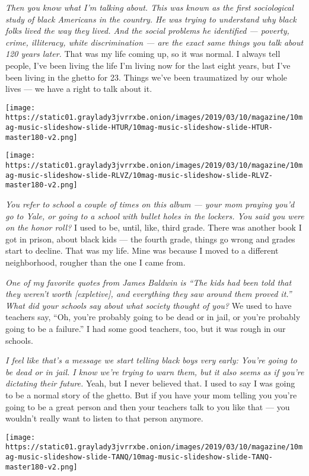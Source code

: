 \emph{Then you know what I'm talking about. This was known as the first
sociological study of black Americans in the country. He was trying to
understand why black folks lived the way they lived. And the social
problems he identified --- poverty, crime, illiteracy, white
discrimination --- are the exact same things you talk about 120 years
later.} That was my life coming up, so it was normal. I always tell
people, I've been living the life I'm living now for the last eight
years, but I've been living in the ghetto for 23. Things we've been
traumatized by our whole lives --- we have a right to talk about it.

\texttt{[image: https://static01.graylady3jvrrxbe.onion/images/2019/03/10/magazine/10mag-music-slideshow-slide-HTUR/10mag-music-slideshow-slide-HTUR-master180-v2.png]}

\texttt{[image: https://static01.graylady3jvrrxbe.onion/images/2019/03/10/magazine/10mag-music-slideshow-slide-RLVZ/10mag-music-slideshow-slide-RLVZ-master180-v2.png]}

\emph{You refer to school a couple of times on this album --- your mom
praying you'd go to Yale, or going to a school with bullet holes in the
lockers. You said you were on the honor roll?} I used to be, until,
like, third grade. There was another book I got in prison, about black
kids --- the fourth grade, things go wrong and grades start to decline.
That was my life. Mine was because I moved to a different neighborhood,
rougher than the one I came from.

\emph{One of my favorite quotes from James Baldwin is ``The kids had
been told that they weren't worth {[}expletive{]}, and everything they
saw around them proved it.'' What did your schools say about what
society thought of you?} We used to have teachers say, ``Oh, you're
probably going to be dead or in jail, or you're probably going to be a
failure.'' I had some good teachers, too, but it was rough in our
schools.

\emph{I feel like that's a message we start telling black boys very
early: You're going to be dead or in jail. I know we're trying to warn
them, but it also seems as if you're dictating their future.} Yeah, but
I never believed that. I used to say I was going to be a normal story of
the ghetto. But if you have your mom telling you you're going to be a
great person and then your teachers talk to you like that --- you
wouldn't really want to listen to that person anymore.

\texttt{[image: https://static01.graylady3jvrrxbe.onion/images/2019/03/10/magazine/10mag-music-slideshow-slide-TANQ/10mag-music-slideshow-slide-TANQ-master180-v2.png]}

